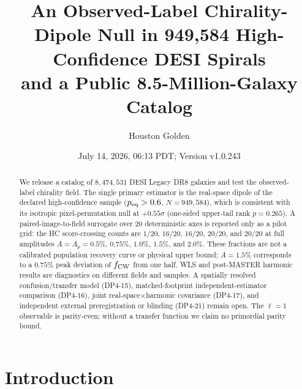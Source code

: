 \documentclass[aps,prd,twocolumn,superscriptaddress,preprintnumbers,nofootinbib,longbibliography,floatfix]{revtex4-2}
\newcommand{\sigmaunit}{\sigma}
\newcommand{\paperVersion}{v1.0.243}
\newcommand{\paperTimestamp}{July 14, 2026, 06:13 PDT}
\begin{document}
\title{An Observed-Label Chirality-Dipole Null in 949,584 High-Confidence DESI Spirals\\
and a Public 8.5-Million-Galaxy Catalog}

\author{Houston Golden}

\date{\paperTimestamp; Version \paperVersion}

\begin{abstract}
We release a catalog of $8{,}474{,}531$ DESI Legacy DR8 galaxies and test the observed-label chirality field. The single primary estimator is the real-space dipole of the declared high-confidence sample ($p_{\rm eq}>0.6$, $N=949{,}584$), which is consistent with its isotropic pixel-permutation null at $+0.55\sigmaunit$ (one-sided upper-tail rank $p=0.265$). A paired-image-to-field surrogate over 20 deterministic axes is reported only as a pilot grid: the HC score-crossing counts are $1/20$, $16/20$, $16/20$, $20/20$, and $20/20$ at full amplitudes $A=A_p=0.5\%$, $0.75\%$, $1.0\%$, $1.5\%$, and $2.0\%$. These fractions are not a calibrated population recovery curve or physical upper bound; $A=1.5\%$ corresponds to a $0.75\%$ peak deviation of $f_{\rm CW}$ from one half. WLS and post-MASTER harmonic results are diagnostics on different fields and samples. A spatially resolved confusion/transfer model (DP4-15), matched-footprint independent-estimator comparison (DP4-16), joint real-space$\times$harmonic covariance (DP4-17), and independent external preregistration or blinding (DP4-21) remain open. The $\ell=1$ observable is parity-even; without a transfer function we claim no primordial parity bound.
\end{abstract}


\maketitle
\tableofcontents

\section{Introduction}
\label{sec:intro}
\end{document}
